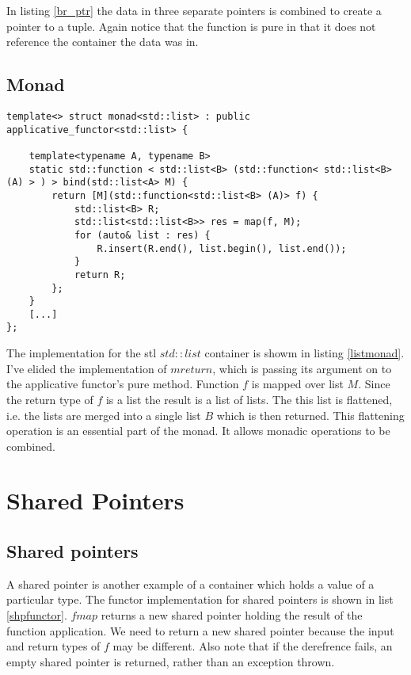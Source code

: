 \documentclass[12pt,fleqn]{article}
\begin{document}
In listing \ref{br_ptr} the data in three separate pointers is combined to create a pointer to a tuple.
Again notice that the function is pure in that it does not reference the container the data was in.
  
%
%
\subsection{Monad}
%
  
  
%
%
%
\begin{minipage}{\linewidth}
\begin{lstlisting}[caption=monad for std::list, label=listmonad]
template<> struct monad<std::list> : public applicative_functor<std::list> {

	template<typename A, typename B>
	static std::function < std::list<B> (std::function< std::list<B> (A) > ) > bind(std::list<A> M) {
		return [M](std::function<std::list<B> (A)> f) {
			std::list<B> R;
			std::list<std::list<B>> res = map(f, M);
			for (auto& list : res) {
				R.insert(R.end(), list.begin(), list.end());
			}
			return R;
		};
	}
    [...]
};
\end{lstlisting}
\end{minipage}
%
%
%
The implementation for the stl $std::list$ container is showm in listing \ref{listmonad}.
I've elided the implementation of $mreturn$, which is passing its argument on to the applicative functor's pure method.
Function $f$ is mapped over list $M$. Since the return type of $f$ is a list the result is a list of lists.
The this list is flattened, i.e. the lists are merged into a single list $B$ which is then returned.
This flattening operation is an essential part of the monad. It allows monadic operations to be combined.

\section{Shared Pointers}

  

\subsection{Shared pointers}
%
%
%

A shared pointer is another example of a container which holds a value of a particular type.
The functor implementation for shared pointers is shown in list \ref{shpfunctor}. 
$fmap$ returns a new shared pointer holding the result of the function application.
We need to return a new shared pointer because the input and return types of $f$ may be different. 
Also note that if the derefrence fails, an empty shared pointer is returned, rather than an exception thrown.
\end{document}
